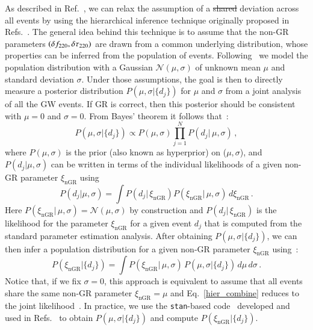 As described in Ref.~\cite{Abbott:2020jks}, we can relax the assumption of a \sout{shared}  deviation across all events by using the hierarchical inference technique originally proposed in Refs.~\cite{Zimmerman:2019wzo,Isi:2019asy}. The general idea behind this technique is to assume that the non-GR parameters $(\delta f_{\text{220}},\delta \tau_{\text{220}})$ are drawn from a common underlying distribution, whose properties can be inferred from the population of events. Following~\cite{Zimmerman:2019wzo,Isi:2019asy,Abbott:2020jks} we model the population distribution with a Gaussian  $\mathcal{N}(\mu,\sigma)$ of unknown mean $\mu$ and standard deviation $\sigma$. Under those assumptions, the goal is then to directly measure a posterior distribution $P(\mu, \sigma |  \{d_j\}) $ for $\mu$ and $\sigma$ from a joint analysis of all the GW events. If GR is correct, then this posterior should be consistent with $\mu=0$ and $\sigma=0$. From Bayes' theorem it follows that~\cite{Isi:2019asy}:
%
\begin{equation}
P(\mu, \sigma |  \{d_j\}) \propto P(\mu,\sigma)\prod _{j=1}^N P(d_j |\, \mu, \sigma) \,,
\end{equation}
%
where $P(\mu,\sigma)$ is the prior (also known as hyperprior) on ($\mu,\sigma$), and $P(d_j | \mu, \sigma) $ can be written in terms of the individual likelihoods of a given non-GR parameter $\xi_{\text{nGR}}$ using~\cite{Isi:2019asy}
%
\begin{equation}
P(d_j | \mu, \sigma) = \int P(d_j |\, \xi_{\text{nGR}})  P(\xi_{\text{nGR}} |\, \mu, \sigma) \,d\xi_{\text{nGR}} \,.
\end{equation}
%
Here $P(\xi_{\text{nGR}} | \,\mu, \sigma) = \mathcal{N}(\mu,\sigma)$ by construction and $P(d_j |\, \xi_{\text{nGR}})$ is the likelihood for the parameter $\xi_{\text{nGR}}$ for a given event $d_j$ that is computed from the standard parameter estimation analysis. After obtaining $P(\mu, \sigma |  \{d_j\})$, we can then infer a population distribution for a given non-GR parameter $\xi_{\text{nGR}}$ using~\cite{Isi:2019asy}:
%
\begin{equation}\label{hier_combine}
P(\xi_{\text{nGR}} | \{d_j\}) = \int P(\xi_{\text{nGR}} |\, \mu, \sigma)\,P(\mu, \sigma |  \{d_j\})\,d\mu\,d\sigma \,.
\end{equation}
%
Notice that, if we fix $\sigma=0$, this approach is equivalent to assume that all events share the same non-GR parameter $\xi_{\text{nGR}} =\mu$ and Eq.~\eqref{hier_combine} reduces to the joint likelihood~\cite{Zimmerman:2019wzo}. In practice, we use the \texttt{stan}-based code~\cite{stan} developed and used in Refs.~\cite{Isi:2019asy,Abbott:2020jks} to obtain $P(\mu, \sigma |  \{d_j\}) $ and compute $P(\xi_{\text{nGR}} | \{d_j\})$.

